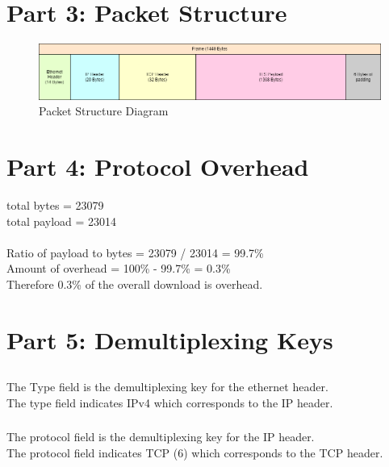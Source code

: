 \documentclass{report}
\begin{document}
    \chapter*{Part 3: Packet Structure}
    \begin{figure}[h]
        \includegraphics[width=\textwidth]{images/packet_structure.drawio.png}
        \caption{Packet Structure Diagram}
    \end{figure}
    \chapter*{Part 4: Protocol Overhead}

    total bytes = 23079\\
    total payload = 23014\\\\

    Ratio of payload to bytes = 23079 / 23014 = 99.7\%\\
    Amount of overhead = 100\% - 99.7\% = 0.3\%\\

    Therefore 0.3\% of the overall download is overhead.\\

    \chapter*{Part 5: Demultiplexing Keys}
    \section{}
    \subsection{}
    The Type field is the demultiplexing key for the ethernet header.\\

    The type field indicates IPv4 which corresponds to the IP header.\\

    \subsection{}
    The protocol field is the demultiplexing key for the IP header.\\

    The protocol field indicates TCP (6) which corresponds to the TCP header.\\
\end{document}
